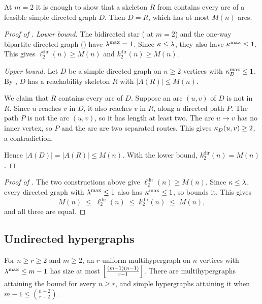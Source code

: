 At $m=2$ it is enough to show that a skeleton $R$ from  contains every arc of a feasible simple directed graph $D$. Then $D=R$, which has at most $M(n)$ arcs.

\begin{proof}[Proof of ]
\emph{Lower bound.} The bidirected star ( at $m=2$) and the one-way bipartite directed graph () have $\lambda^{\max} = 1$.
Since $\kappa\le\lambda$, they also have $\kappa^{\max} \le 1$.
This gives $\ell_2^{\mathrm{dir}}(n) \ge M(n)$ and $k_2^{\mathrm{dir}}(n) \ge M(n)$.

\emph{Upper bound.} Let $D$ be a simple directed graph on $n \ge 2$ vertices with $\kappa^{\max}_D \le 1$.
By , $D$ has a reachability skeleton $R$ with $|A(R)| \le M(n)$.

We claim that $R$ contains every arc of $D$.
Suppose an arc $(u,v)$ of $D$ is not in $R$.
Since $u$ reaches $v$ in $D$, it also reaches $v$ in $R$, along a directed path $P$.
The path $P$ is not the arc $(u,v)$, so it has length at least two.
The arc $u\to v$ has no inner vertex, so $P$ and the arc are two separated routes.
This gives $\kappa_D(u,v) \ge 2$, a contradiction.

Hence $|A(D)| = |A(R)| \le M(n)$. With the lower bound, $k_2^{\mathrm{dir}}(n) = M(n)$.
\end{proof}

\begin{proof}[Proof of ]
The two constructions above give $\ell_2^{\mathrm{dir}}(n) \ge M(n)$.
Since $\kappa\le\lambda$, every directed graph with $\lambda^{\max}\le1$ also has $\kappa^{\max}\le1$, so  bounds it. This gives
\[
    M(n) \;\le\; \ell_2^{\mathrm{dir}}(n) \;\le\; k_2^{\mathrm{dir}}(n) \;\le\; M(n),
\]
and all three are equal.
\end{proof}

\subsection{Undirected hypergraphs}\label{sec:hyper-results}

\begin{theorem}\label{prop:hyper-edge}
For $n\ge r\ge2$ and $m\ge2$, an $r$-uniform multihypergraph on $n$ vertices with $\lambda^{\max}\le m-1$ has size at most $\left\lfloor \frac{(m-1)(n-1)}{r-1} \right\rfloor$. There are multihypergraphs attaining the bound for every $n\ge r$, and simple hypergraphs attaining it when $m - 1 \le \binom{n-2}{r-2}$.
\end{theorem}

